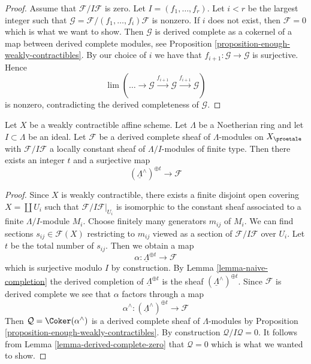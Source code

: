 \begin{proof}
Assume that $\mathcal{F}/I\mathcal{F}$ is zero.
Let $I = (f_1, \ldots, f_r)$. Let $i < r$ be the largest
integer such that $\mathcal{G} = \mathcal{F}/(f_1, \ldots, f_i)\mathcal{F}$
is nonzero. If $i$ does not exist, then $\mathcal{F} = 0$ which is what we
want to show. Then $\mathcal{G}$ is derived complete as a cokernel
of a map between derived complete modules, see
Proposition \ref{proposition-enough-weakly-contractibles}.
By our choice of $i$ we have that $f_{i + 1} : \mathcal{G} \to \mathcal{G}$
is surjective. Hence
$$
\lim (\ldots \to \mathcal{G} \xrightarrow{f_{i + 1}} \mathcal{G}
\xrightarrow{f_{i + 1}} \mathcal{G})
$$
is nonzero, contradicting the derived completeness of $\mathcal{G}$.
\end{proof}

\begin{lemma}
\label{lemma-derived-complete-limit}
Let $X$ be a weakly contractible affine scheme.
Let $\Lambda$ be a Noetherian ring and let $I \subset \Lambda$ be an ideal.
Let $\mathcal{F}$ be a derived complete sheaf of $\Lambda$-modules
on $X_\proetale$ with $\mathcal{F}/I\mathcal{F}$ a locally
constant sheaf of $\Lambda/I$-modules of finite type.
Then there exists an integer $t$ and a surjective map
$$
(\underline{\Lambda}^\wedge)^{\oplus t} \to \mathcal{F}
$$
\end{lemma}

\begin{proof}
Since $X$ is weakly contractible, there exists a finite disjoint open
covering $X = \coprod U_i$ such that $\mathcal{F}/I\mathcal{F}|_{U_i}$
is isomorphic to the constant sheaf associated to a finite $\Lambda/I$-module
$M_i$. Choose finitely many generators $m_{ij}$ of $M_i$. We
can find sections $s_{ij} \in \mathcal{F}(X)$ restricting to
$m_{ij}$ viewed as a section of $\mathcal{F}/I\mathcal{F}$ over $U_i$. 
Let $t$ be the total number of $s_{ij}$. Then we obtain a map
$$
\alpha : \underline{\Lambda}^{\oplus t} \longrightarrow \mathcal{F}
$$
which is surjective modulo $I$ by construction. By
Lemma \ref{lemma-naive-completion}
the derived completion of $\underline{\Lambda}^{\oplus t}$ is the
sheaf $(\underline{\Lambda}^\wedge)^{\oplus t}$. Since $\mathcal{F}$
is derived complete we see that $\alpha$ factors through a map
$$
\alpha^\wedge :
(\underline{\Lambda}^\wedge)^{\oplus t}
\longrightarrow
\mathcal{F}
$$
Then $\mathcal{Q} = \Coker(\alpha^\wedge)$ is a derived complete
sheaf of $\Lambda$-modules by
Proposition \ref{proposition-enough-weakly-contractibles}.
By construction $\mathcal{Q}/I\mathcal{Q} = 0$. It follows from
Lemma \ref{lemma-derived-complete-zero}
that $\mathcal{Q} = 0$ which is what we wanted to show.
\end{proof}








